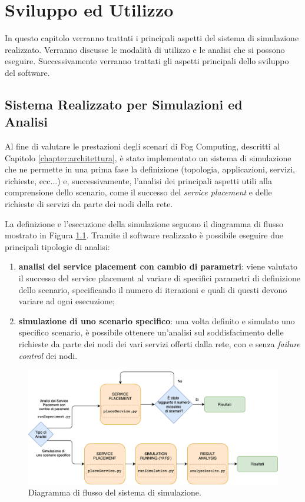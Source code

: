 \chapter{Sviluppo ed Utilizzo}
\label{chapter:implementazione}

In questo capitolo verranno trattati i principali aspetti del sistema di simulazione realizzato. Verranno discusse le modalità di utilizzo e le analisi che si possono eseguire. Successivamente verranno trattati gli aspetti principali dello sviluppo del software.

\section[Sistema Realizzato per Simulazioni ed Analisi]{Sistema Realizzato per Simulazioni ed\\ Analisi}
\label{section:sistema_analisi}

Al fine di valutare le prestazioni degli scenari di Fog Computing, descritti al Capitolo \ref{chapter:architettura}, è stato implementato un sistema di simulazione che ne permette in una prima fase la definizione (topologia, applicazioni, servizi, richieste, ecc...) e, successivamente, l'analisi dei principali aspetti utili alla comprensione dello scenario, come il successo del \textit{service placement} e delle richieste di servizi da parte dei nodi della rete.

La definizione e l'esecuzione della simulazione seguono il diagramma di flusso mostrato in Figura \ref{fig:sim_flow_diagram}. Tramite il software realizzato è possibile eseguire due principali tipologie di analisi:
\begin{enumerate}
	\item \textbf{analisi del service placement con cambio di parametri}: viene valutato il successo del service placement al variare di specifici parametri di definizione dello scenario, specificando il numero di iterazioni e quali di questi devono variare ad ogni esecuzione;
	\item \textbf{simulazione di uno scenario specifico}: una volta definito e simulato uno specifico scenario, è possibile ottenere un'analisi sul soddisfacimento delle richieste da parte dei nodi dei vari servizi offerti dalla rete, con e senza \textit{failure control} dei nodi.
\end{enumerate}


\begin{figure}[!ht]
  \includegraphics[width=14cm]{images/sim_flow_diagram}
  \centering
  \caption{Diagramma di flusso del sistema di simulazione.}
  \label{fig:sim_flow_diagram}
\end{figure}

